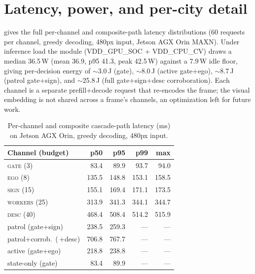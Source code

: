 \documentclass[10pt,twocolumn,letterpaper]{article}
\begin{document}
\section{Latency, power, and per-city detail}
\label{supp:cost}

 gives the full per-channel and composite-path latency distributions (60 requests per channel, greedy decoding, 480px input, Jetson AGX Orin MAXN).  Under inference load the module (VDD\_GPU\_SOC + VDD\_CPU\_CV) draws a median 36.5\,W (mean 36.9, p95 41.3, peak 42.5\,W) against a 7.9\,W idle floor, giving per-decision energy of $\sim$3.0\,J (gate), $\sim$8.0\,J (active gate+ego), $\sim$8.7\,J (patrol gate+sign), and $\sim$25.8\,J (full gate+sign+desc corroboration).  Each channel is a separate prefill+decode request that re-encodes the frame; the visual embedding is not shared across a frame's channels, an optimization left for future work.

\begin{table}[t]
\centering\small
\begin{tabular}{@{}lrrrr@{}}
\toprule
Channel (budget) & p50 & p95 & p99 & max \\
\midrule
\textsc{gate} (3)    & 83.4  & 89.9  & 93.7  & 94.0 \\
\textsc{ego} (8)     & 135.5 & 148.8 & 153.1 & 158.5 \\
\textsc{sign} (15)   & 155.1 & 169.4 & 171.1 & 173.5 \\
\textsc{workers} (25)& 313.9 & 341.3 & 344.1 & 344.7 \\
\textsc{desc} (40)   & 468.4 & 508.4 & 514.2 & 515.9 \\
\midrule
patrol (gate+sign)          & 238.5 & 259.3 & --- & --- \\
patrol+corrob.\ (\,+desc)   & 706.8 & 767.7 & --- & --- \\
active (gate+ego)           & 218.8 & 238.8 & --- & --- \\
state-only (gate)           & 83.4  & 89.9  & --- & --- \\
\bottomrule
\end{tabular}
\caption{Per-channel and composite cascade-path latency (ms) on Jetson AGX Orin, greedy decoding, 480px input.}
\label{supp:tab:latency}
\end{table}
\end{document}
